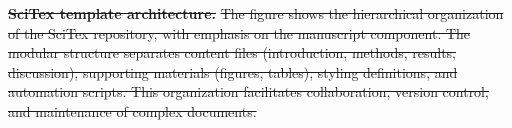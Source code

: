 \documentclass[preprint,review,12pt]{elsarticle}%
\providecommand{\DIFdeltex}[1]{{\protect\color{red}\sout{#1}}}                      %
\providecommand{\DIFdelFL}[1]{\DIFdel{#1}} %
\providecommand{\DIFdel}[1]{\texorpdfstring{\DIFdeltex{#1}}{}} %
\begin{document}
\begin{frontmatter}
{%
\textbf{\DIFdelFL{SciTex template architecture.}} %
\DIFdelFL{The figure shows the hierarchical organization of the SciTex repository, with emphasis on the manuscript component. The modular structure separates content files (introduction, methods, results, discussion), supporting materials (figures, tables), styling definitions, and automation scripts. This organization facilitates collaboration, version control, and maintenance of complex documents.}}







\end{frontmatter}
\end{document}
